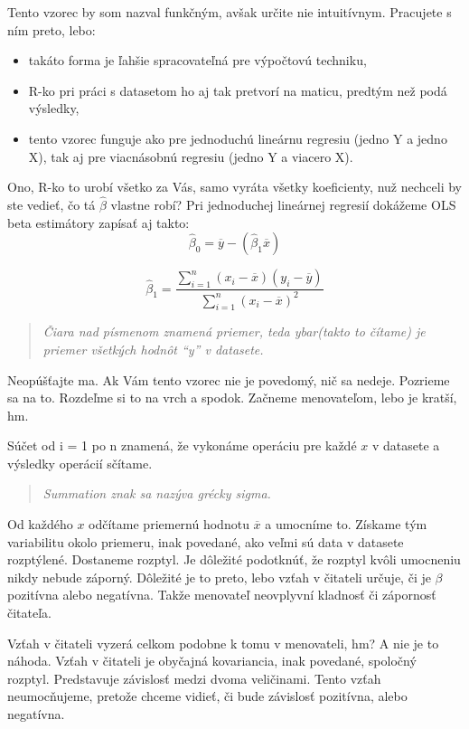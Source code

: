 Tento vzorec by som nazval funkčným, avšak určite nie intuitívnym.
Pracujete s ním preto, lebo:

\begin{itemize}
\tightlist
\item
  takáto forma je ľahšie spracovateľná pre výpočtovú techniku,
\item
  R-ko pri práci s datasetom ho aj tak pretvorí na maticu, predtým než
  podá výsledky,
\item
  tento vzorec funguje ako pre jednoduchú lineárnu regresiu (jedno Y a
  jedno X), tak aj pre viacnásobnú regresiu (jedno Y a viacero X).
\end{itemize}

Ono, R-ko to urobí všetko za Vás, samo vyráta všetky koeficienty, nuž
nechceli by ste vedieť, čo tá \(\hat\beta\) vlastne robí? Pri
jednoduchej lineárnej regresií dokážeme OLS beta estimátory zapísať aj
takto:
\[\hat\beta_0 = \overline{y} - (\hat\beta_1\overline{x})\]

\[\hat\beta_1 = \frac{\sum_{i=1}^{n} (x_i - \overline{x})(y_i - \overline{y})}{\sum_{i=1}^{n} (x_i - \overline{x})^2}\]


\begin{quote}
\emph{Čiara nad písmenom znamená priemer, teda ybar(takto to čítame) je
priemer všetkých hodnôt ``y'' v datasete.}
\end{quote}

Neopúšťajte ma. Ak Vám tento vzorec nie je povedomý, nič sa nedeje.
Pozrieme sa na to. Rozdeľme si to na vrch a spodok. Začneme menovateľom,
lebo je kratší, hm.

Súčet od i = 1 po n znamená, že vykonáme operáciu pre každé \(x\) v
datasete a výsledky operácií sčítame.


\begin{quote}
\begin{center}
\emph{Summation znak sa nazýva grécky sigma.}
\end{center}
\end{quote}


Od každého \(x\) odčítame priemernú hodnotu \(\overline{x}\) a umocníme
to. Získame tým variabilitu okolo priemeru, inak povedané, ako veľmi sú
data v datasete rozptýlené. Dostaneme rozptyl. Je dôležité podotknúť, že
rozptyl kvôli umocneniu nikdy nebude záporný. Dôležité je to preto, lebo
vzťah v čitateli určuje, či je \(\beta\) pozitívna alebo negatívna.
Takže menovateľ neovplyvní kladnosť či zápornosť čitateľa.

Vzťah v čitateli vyzerá celkom podobne k tomu v menovateli, hm? A nie je
to náhoda. Vzťah v čitateli je obyčajná kovariancia, inak povedané,
spoločný rozptyl. Predstavuje závislosť medzi dvoma veličinami. Tento
vzťah neumocňujeme, pretože chceme vidieť, či bude závislosť pozitívna,
alebo negatívna.

